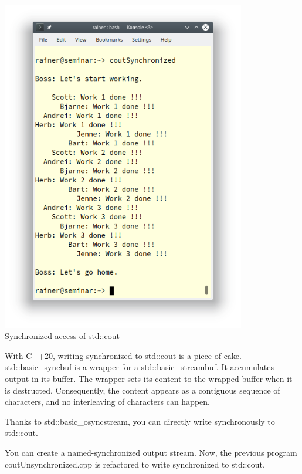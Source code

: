 \begin{center}
\includegraphics[width=0.8\textwidth]{content/3/chapter6/images/30.png}\\
Synchronized access of std::cout
\end{center}

With C++20, writing synchronized to std::cout is a piece of cake. std::basic\_syncbuf is a wrapper for a \href{https://en.cppreference.com/w/cpp/io/basic_streambuf}{std::basic\_streambuf}. It accumulates output in its buffer. The wrapper sets its content to the wrapped buffer when it is destructed. Consequently, the content appears as a contiguous sequence of characters, and no interleaving of characters can happen.

Thanks to std::basic\_osyncstream, you can directly write synchronously to std::cout.

You can create a named-synchronized output stream. Now, the previous program coutUnsynchronized.cpp is refactored to write synchronized to std::cout.

